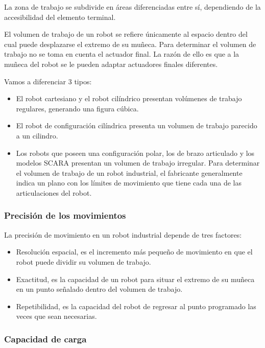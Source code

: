 \documentclass[12pt,a4papert,woside,openright,titlepage,final]{book}
\begin{document}
La zona de trabajo se subdivide en áreas diferenciadas entre sí, dependiendo de
la accesibilidad del elemento terminal.

El volumen de trabajo de un robot se refiere únicamente al espacio dentro del
cual puede desplazarse el extremo de su muñeca. Para determinar el volumen de
trabajo no se toma en cuenta el actuador final. La razón de ello es que a la
muñeca del robot se le pueden adaptar actuadores finales diferentes.

Vamos a diferenciar 3 tipos:
\begin{itemize}
    \item El robot cartesiano y el robot cilíndrico presentan volúmenes de
    trabajo regulares, generando una figura cúbica.
    \item El robot de configuración cilíndrica presenta un volumen de trabajo
    parecido a un cilindro.
    \item Los robots que poseen una configuración polar, los de brazo articulado
    y los modelos SCARA presentan un volumen de trabajo irregular. Para
    determinar el volumen de trabajo de un robot industrial, el fabricante
    generalmente indica un plano con los límites de movimiento que tiene cada
    una de las articulaciones del robot.
\end{itemize}


\subsubsection{Precisión de los movimientos}

La precisión de movimiento en un robot industrial depende de tres factores:

\begin{itemize}
    \item Resolución espacial, es el incremento más pequeño de movimiento en que
    el robot puede dividir su volumen de trabajo. 
    \item Exactitud, es la capacidad de un robot para situar el extremo de su
    muñeca en un punto señalado dentro del volumen de trabajo.
    \item Repetibilidad, es la capacidad del robot de regresar al punto
    programado las veces que sean necesarias. 
\end{itemize}


\subsubsection{Capacidad de carga}
\end{document}
